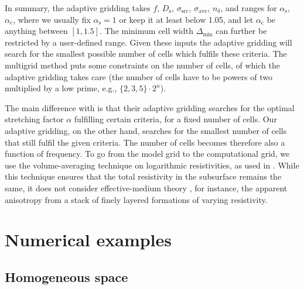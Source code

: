 \documentclass[extra, camera,%
    referee,     %
]{gji}
\newcommand{\mr}[1]{\mathrm{#1}}
\newcommand{\emg}[2]{\texttt{emg#1#2}\xspace}
\begin{document}
In summary, the adaptive gridding takes $f$, $D_\mr{s}$, $\sigma_\mr{src}$,
$\sigma_\mr{ave}$, $n_\delta$, and ranges for $\alpha_\mr{s}$, $\alpha_\mr{c}$,
where we usually fix $\alpha_\mr{s}=1$ or keep it at least below 1.05, and let
$\alpha_\mr{c}$ be anything between $[1, 1.5]$. The minimum cell width
$\Delta_\mr{min}$ can further be restricted by a user-defined range. Given
these inputs the adaptive gridding will search for the smallest possible number
of cells which fulfils these criteria. The  multigrid method
\deleted{implemented in \emg3d} puts some constraints on the number of cells, of
which the adaptive gridding takes care (the number of cells have to be powers
of two multiplied by a low prime, e.g., $\{2,3,5\}\cdot2^n$).

The main difference with \cite{GEO.08.Mulder} is that their adaptive gridding
searches for the optimal stretching factor $\alpha$ fulfilling certain
criteria, for a fixed number of cells. Our adaptive gridding, on the other
hand, searches for the smallest number of cells that still fulfil the given
criteria. The number of cells becomes therefore also a function of frequency.
 To go from the model grid to the computational
grid, we use the volume-averaging technique on logarithmic resistivities, as
used in \cite{GEO.07.Plessix}. While this technique ensures that the total
resistivity in the subsurface remains the same, it does not consider
effective-medium theory \citep{GEO.03.Davydycheva}, for instance, the apparent
anisotropy from a stack of finely layered formations of varying resistivity.


\section{Numerical examples}  %


\subsection{Homogeneous space}  %
\end{document}
